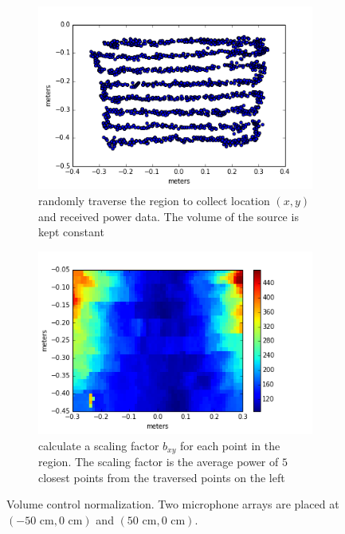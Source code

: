 \begin{figure}[h!]
  \centering
  \begin{subfigure}[]{.48\textwidth}
    \includegraphics[width=\textwidth]{scaling_pos.png}
    \caption{randomly traverse the region to collect location $(x,y)$ and received power data. The volume of the source is kept constant}
    \label{fig:color_pos}
  \end{subfigure}
  \centering
  \begin{subfigure}[]{.48\textwidth}
    \includegraphics[width=\textwidth]{color_scaling.png}
    \caption{calculate a scaling factor $b_{xy}$ for each point in the region. The scaling factor is the average power of $5$ closest points from the traversed points on the left}
    \label{fig:color_scale}
  \end{subfigure}
  \caption{Volume control normalization. Two microphone arrays are placed at $(-50\mbox{ cm}, 0\mbox{ cm})$ and $(50\mbox{ cm}, 0\mbox{ cm})$.}
  \label{fig:color_norm}
\end{figure}

